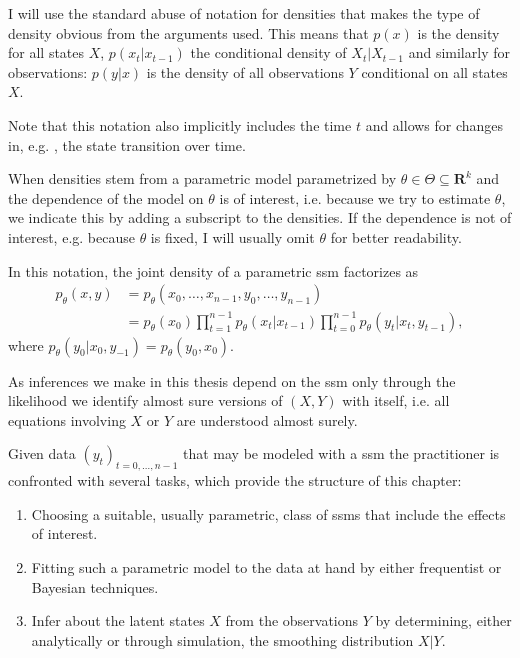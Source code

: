 \begin{notation}
    I will use the standard abuse of notation for densities that makes the type of density \glqq{}obvious\grqq{} from the arguments used.
    This means that $p(x)$ is the density for all states $X$, $p(x_t|x_{t - 1})$ the conditional density of $X_t|X_{t - 1}$ and similarly for observations: $p(y|x)$ is the density of all observations $Y$ conditional on all states $X$.

    Note that this notation also implicitly includes the time $t$ and allows for changes in, e.g. , the state transition over time.

    When densities stem from a parametric model parametrized by $\theta \in \Theta \subseteq \mathbf{R}^{k}$ and the dependence of the model on $\theta$ is of interest, i.e. because we try to estimate $\theta$, we indicate this by adding a subscript to the densities.
    If the dependence is not of interest, e.g. because $\theta$ is fixed, I will usually omit $\theta$ for better readability.

    In this notation, the joint density of a parametric \gls{ssm} factorizes as
    \begin{align*}
        p_\theta(x,y) & = p_\theta(x_0, \dots, x_{n - 1}, y_0, \dots, y_{n - 1})                                                              \\
                      & = p_\theta (x_0)\prod_{t = 1}^{n - 1} p_\theta(x_{t}|x_{t - 1}) \prod_{t = 0}^{n - 1} p_\theta(y_t | x_t, y_{t - 1}),
    \end{align*}
    where $p_\theta(y_0|x_0, y_{-1}) = p_\theta(y_0, x_0)$.

    As inferences we make in this thesis depend on the \gls{ssm} only through the likelihood we identify almost sure versions of $(X, Y)$ with itself, i.e. all equations involving $X$ or $Y$ are understood almost surely.
\end{notation}

Given data $(y_t)_{t = 0, \dots, n - 1}$ that may be modeled with a \gls{ssm} the practitioner is confronted with several tasks, which provide the structure of this chapter:

\begin{enumerate}
    \item\label{it:model_choice} Choosing a suitable, usually parametric, class of \glspl{ssm} that include the effects of interest.
    \item\label{it:model_fitting} Fitting such a parametric model to the data at hand by either frequentist or Bayesian techniques.
    \item\label{it:smoothing_problem} Infer about the latent states $X$ from the observations $Y$ by determining, either analytically or through simulation, the smoothing distribution $X|Y$.
\end{enumerate}

